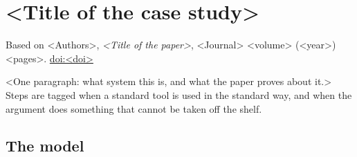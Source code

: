 %
%
%

\chapter{<Title of the case study>}\label{p:case-<short-name>}

\begin{byline}Based on <Authors>, \emph{<Title of the paper>}, <Journal> <volume> (<year>) <pages>. \href{https://doi.org/<doi>}{doi:<doi>}\end{byline}

<One paragraph: what system this is, and what the paper proves about it.>
Steps are tagged \routine{} when a standard tool is used in the standard way, and \newidea{} when the argument does something that cannot be taken off the shelf.


\section{The model}

